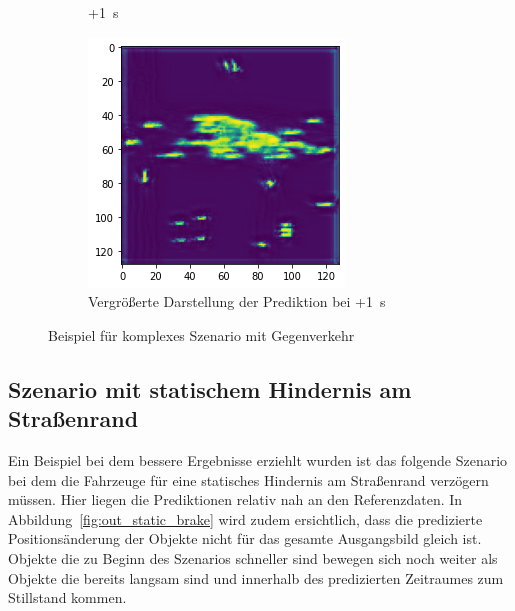 \documentclass[12pt]{article}
\begin{document}
\begin{figure}[H]
\begin{subfigure}[b]{0.18\textwidth}
                \caption{+1~s}
            \end{subfigure}
            \vspace{1cm}
            \begin{subfigure}[b]{0.6\textwidth}
                \includegraphics[width=\textwidth]{output_opposite_4.png}
                \caption{Vergrößerte Darstellung der Prediktion bei +1~s}
            \end{subfigure}
            \caption{Beispiel für komplexes Szenario mit Gegenverkehr}\label{fig:out_opposite}
        \end{figure}

    \pagebreak
    \subsection{Szenario mit statischem Hindernis am Straßenrand} 
        Ein Beispiel bei dem bessere Ergebnisse erziehlt wurden ist das folgende Szenario bei dem die Fahrzeuge für eine statisches Hindernis am Straßenrand verzögern müssen. 
        Hier liegen die Prediktionen relativ nah an den Referenzdaten. In Abbildung~\ref{fig:out_static_brake} wird zudem ersichtlich, dass die predizierte Positionsänderung der Objekte nicht für das gesamte Ausgangsbild gleich ist. 
        Objekte die zu Beginn des Szenarios schneller sind bewegen sich noch weiter als Objekte die bereits langsam sind und innerhalb des predizierten Zeitraumes zum Stillstand kommen. 
\end{document}
